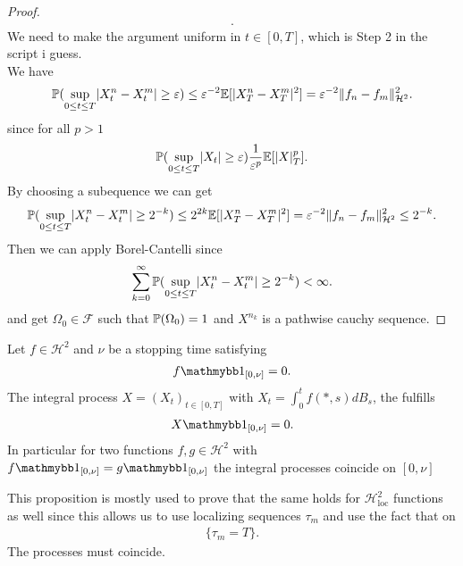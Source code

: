 \begin{proof}
\begin{align*}
.\end{align*}
We need to make the argument uniform in $t \in  [0,T]$, which is Step 2 in the script i guess.\\[1ex]
We have
\begin{align*}
  \P(\sup_{0\le t\le T} \abs{X_t^n - X_t^m} \ge  \epsilon)  \le  \epsilon^{-2} \E[\abs{X_T^n - X_T^m}^2] = \epsilon^{-2} \|f_n-f_m\|^2_{\mathcal{H}^2}
.\end{align*}
since  for all $p>1$
\begin{align*}
  \P(\sup_{0\le t\le T} \abs{X_t} \ge  \epsilon) \frac{1}{\epsilon^p} \E[\abs{X}_T^p]
.\end{align*}
By choosing a subequence we can get 
\begin{align*}
  \P(\sup_{0\le t\le T} \abs{X_t^n - X_t^m} \ge  2^{-k} )  \le  2^{2k} \E[\abs{X_T^n - X_T^m}^2] = \epsilon^{-2} \|f_n-f_m\|^2_{\mathcal{H}^2} \le  2^{-k} 
.\end{align*}
Then we can apply Borel-Cantelli since
\begin{align*}
  \sum_{k=0}^{\infty}   \P(\sup_{0\le t\le T} \abs{X_t^n - X_t^m} \ge  2^{-k} ) < \infty
.\end{align*}
and get $\Omega_0 \in  \mathcal{F}$ such that $\P(\Omega_0) = 1$ and $X^{n_k} $ is a pathwise cauchy sequence.
\end{proof}
\begin{Prop}[3.10]
 Let $f \in  \mathcal{H}^2$ and $\nu $ be a stopping time satisfying 
 \begin{align*}
   f \cha_{[0,\nu]} = 0
 .\end{align*}
 The integral process $X=(X_t)_{t \in  [0,T]}$ with $X_t = \int_0^{t} f(*,s) dB_s $, the fulfills 
 \begin{align*}
   X \cha_{[0,\nu ]} = 0
 .\end{align*}
 In particular for two functions $f,g \in  \mathcal{H}^2$ with $f \cha_{[0,\nu ]} = g \cha_{[0,\nu ]}$ the integral processes coincide on $[0,\nu ]$
\end{Prop}
\begin{remark}
  This proposition is mostly used to prove that the same holds for $\mathcal{H}^2_{\text{loc}}$  functions as well since this allows us 
  to use localizing sequences $\tau_m$ and use the fact that on 
  \begin{align*}
    \{\tau_m = T\}  
  .\end{align*}
  The processes must coincide.
\end{remark}
